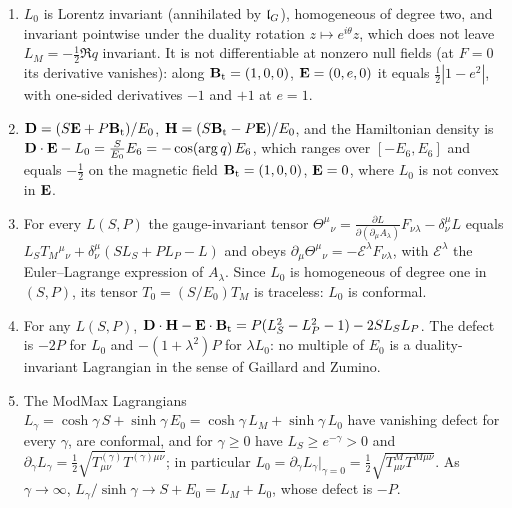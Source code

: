 \begin{theorem}
\label{r1:thm:L0}
\begin{enumerate}[label=(\roman*),leftmargin=2.2em]
\item $L_0$ is Lorentz invariant (annihilated by $\mathfrak l_G$), homogeneous of degree two, and invariant pointwise under the duality rotation
$z\mapsto e^{i\theta}z$, which does not leave $L_M=-\tfrac12\Re q$ invariant. It is not differentiable at nonzero null fields (at $F=0$ its
derivative vanishes): along
$\mathbf B_{\rm t}=(1,0,0)$, $\mathbf E=(0,e,0)$ it equals $\tfrac12|1-e^2|$, with one-sided derivatives $-1$ and $+1$ at $e=1$.
\item $\mathbf D=(S\mathbf E+P\mathbf B_{\rm t})/E_0$, $\mathbf H=(S\mathbf B_{\rm t}-P\mathbf E)/E_0$, and the Hamiltonian density is
$\mathbf D\cdot\mathbf E-L_0=\tfrac S{E_0}E_6=-\cos(\arg q)\,E_6$, which ranges over $[-E_6,E_6]$ and equals $-\tfrac12$ on the magnetic field
$\mathbf B_{\rm t}=(1,0,0)$, $\mathbf E=0$, where $L_0$ is not convex in $\mathbf E$.
\item For every $L(S,P)$ the gauge-invariant tensor $\Theta^\mu{}_\nu=\frac{\partial L}{\partial(\partial_\mu A_\lambda)}F_{\nu\lambda}-\delta^\mu_\nu L$
equals $L_ST_M{}^\mu{}_\nu+\delta^\mu_\nu(SL_S+PL_P-L)$ and obeys $\partial_\mu \Theta^\mu{}_\nu=-\mathcal E^\lambda F_{\nu\lambda}$, with
$\mathcal E^\lambda$ the Euler--Lagrange expression of $A_\lambda$. Since $L_0$ is homogeneous of degree one in $(S,P)$, its tensor
$T_0=(S/E_0)T_M$ is traceless: $L_0$ is conformal.
\item For any $L(S,P)$, $\mathbf D\cdot\mathbf H-\mathbf E\cdot\mathbf B_{\rm t}=P(L_S^2-L_P^2-1)-2SL_SL_P$. The defect is $-2P$ for $L_0$ and
$-(1+\lambda^2)P$ for $\lambda L_0$: no multiple of $E_0$ is a duality-invariant Lagrangian in the sense of Gaillard and Zumino.
\item The ModMax Lagrangians $L_\gamma=\cosh\gamma\,S+\sinh\gamma\,E_0=\cosh\gamma\,L_M+\sinh\gamma\,L_0$ have vanishing defect for every
$\gamma$, are conformal, and for $\gamma\ge0$ have $L_S\ge e^{-\gamma}>0$ and $\partial_\gamma L_\gamma=\tfrac12\sqrt{T^{(\gamma)}_{\mu\nu}T^{(\gamma)\mu\nu}}$;
in particular $L_0=\partial_\gamma L_\gamma|_{\gamma=0}=\tfrac12\sqrt{T^M_{\mu\nu}T^{M\mu\nu}}$. As $\gamma\to\infty$,
$L_\gamma/\sinh\gamma\to S+E_0=L_M+L_0$, whose defect is $-P$.
\end{enumerate}
\end{theorem}

